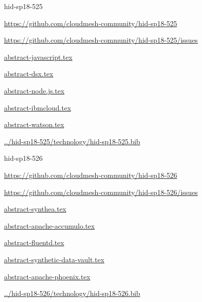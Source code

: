 \begin{IU}

hid-sp18-525

\url{https://github.com/cloudmesh-community/hid-sp18-525}

\url{https://github.com/cloudmesh-community/hid-sp18-525/issues}

\href{https://github.com/cloudmesh-community/hid-sp18-525/blob/master//technology/abstract-javascript.tex}{abstract-javascript.tex}

\href{https://github.com/cloudmesh-community/hid-sp18-525/blob/master//technology/abstract-dsx.tex}{abstract-dsx.tex}

\href{https://github.com/cloudmesh-community/hid-sp18-525/blob/master//technology/abstract-node.js.tex}{abstract-node.js.tex}

\href{https://github.com/cloudmesh-community/hid-sp18-525/blob/master//technology/abstract-ibmcloud.tex}{abstract-ibmcloud.tex}

\href{https://github.com/cloudmesh-community/hid-sp18-525/blob/master//technology/abstract-watson.tex}{abstract-watson.tex}

\href{https://github.com/cloudmesh-community/hid-sp18-525/blob/master//technology/hid-sp18-525.bib}{../hid-sp18-525/technology/hid-sp18-525.bib}

\end{IU}


\begin{IU}

hid-sp18-526

\url{https://github.com/cloudmesh-community/hid-sp18-526}

\url{https://github.com/cloudmesh-community/hid-sp18-526/issues}

\href{https://github.com/cloudmesh-community/hid-sp18-526/blob/master//technology/abstract-synthea.tex}{abstract-synthea.tex}

\href{https://github.com/cloudmesh-community/hid-sp18-526/blob/master//technology/abstract-apache-accumulo.tex}{abstract-apache-accumulo.tex}

\href{https://github.com/cloudmesh-community/hid-sp18-526/blob/master//technology/abstract-fluentd.tex}{abstract-fluentd.tex}

\href{https://github.com/cloudmesh-community/hid-sp18-526/blob/master//technology/abstract-synthetic-data-vault.tex}{abstract-synthetic-data-vault.tex}

\href{https://github.com/cloudmesh-community/hid-sp18-526/blob/master//technology/abstract-apache-phoenix.tex}{abstract-apache-phoenix.tex}

\href{https://github.com/cloudmesh-community/hid-sp18-526/blob/master//technology/hid-sp18-526.bib}{../hid-sp18-526/technology/hid-sp18-526.bib}

\end{IU}


